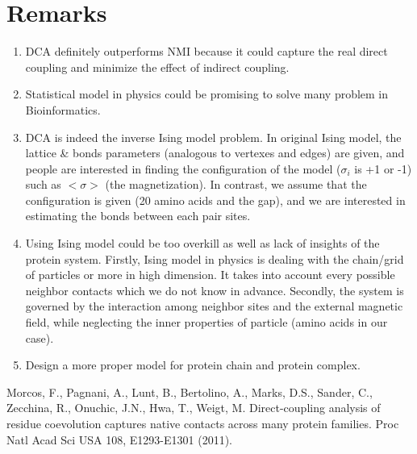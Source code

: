 \documentclass[a4paper,12pt]{article}
\begin{document}
\section*{Remarks}
\begin{enumerate}
\item
DCA definitely outperforms NMI because it could capture the real direct coupling and minimize the effect of indirect coupling.
\item
Statistical model in physics could be promising to solve many problem in Bioinformatics.
\item
DCA is indeed the inverse Ising model problem. In original Ising model, the lattice \& bonds parameters (analogous to vertexes and edges) are given, and people are interested in finding the configuration of the model ($\sigma_i $ is +1 or -1) such as $< \sigma>$ (the magnetization). In contrast, we assume that the configuration is given (20 amino acids and the gap), and we are interested in estimating the bonds between each pair sites. 
\item
Using Ising model could be too overkill as well as lack of insights of the protein system. Firstly, Ising model in physics is dealing with the chain/grid of particles or more in high dimension. It takes into account every possible neighbor contacts which we do not know in advance. Secondly, the system is governed by the interaction among neighbor sites and the external magnetic field, while neglecting the inner properties of particle (amino acids in our case). 
\item
Design a more proper model for protein chain and protein complex. 

\end{enumerate}

\begin{thebibliography}{1}

   Morcos, F., Pagnani, A., Lunt, B., Bertolino, A., Marks, D.S., Sander, C., Zecchina, R., Onuchic, J.N., Hwa, T., Weigt, M. Direct-coupling analysis of residue coevolution captures native contacts across many protein families. Proc Natl Acad Sci USA 108, E1293-E1301 (2011).

  

  \end{thebibliography}
\end{document}
